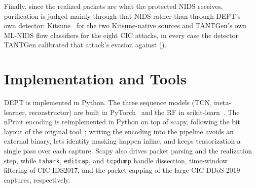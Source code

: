 Finally, since the realized packets are what the protected \ac{NIDS} receives,
purification is judged mainly through that \ac{NIDS} rather than through DEPT's own
detector: Kitsune~\cite{mirsky2018kitsune} for the two Kitsune-native sources and
TANTGen's own ML-NIDS flow classifiers for the eight CIC attacks, in every case the
detector TANTGen calibrated that attack's evasion against
().

\section{Implementation and Tools}\label{sec:sol-tools}
DEPT is implemented in Python. The three sequence models (\ac{TCN}, meta-learner,
reconstructor) are built in PyTorch~\cite{paszke2019pytorch} and the \ac{RF} in
scikit-learn~\cite{pedregosa2011scikit}. The nPrint
encoding is reimplemented in Python on top of scapy, following the bit layout of the
original tool~\cite{holland2021nprint}; writing the encoding into the pipeline avoids an
external binary, lets identity masking happen inline, and keeps tensorization a
single pass over each capture. Scapy also drives packet parsing and the realization
step, while \texttt{tshark}, \texttt{editcap}, and \texttt{tcpdump} handle dissection,
time-window filtering of CIC-IDS2017, and the packet-capping of the large CIC-DDoS-2019
captures, respectively.

